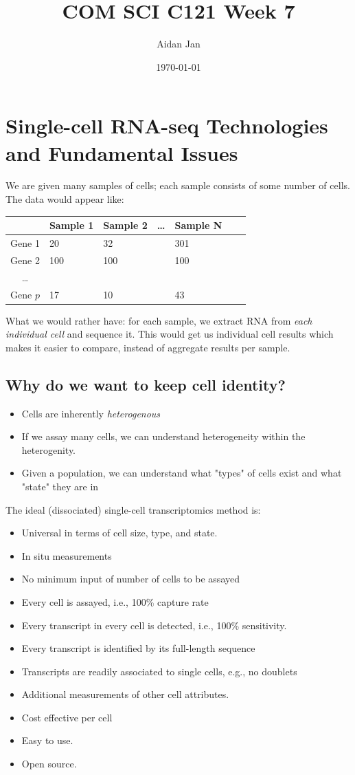 \documentclass[10pt]{article}
\title{COM SCI C121 Week 7}
\author{Aidan Jan}
\date{\today}
\begin{document}
\maketitle

\section*{Single-cell RNA-seq Technologies and Fundamental Issues}
We are given many samples of cells; each sample consists of some number of cells.  The data would appear like:
\begin{tabularx}{\textwidth}{|c| * {6}{Y|}}
\hline
 & Sample 1 & Sample 2 & \dots & Sample N\\
\hline
Gene 1 & 20 & 32 & & 301 \\
\hline
Gene 2 & 100 & 100 & & 100 \\
\hline
\dots & & & & \\
\hline
Gene $p$ & 17 & 10 & & 43\\
\hline
\end{tabularx}
What we would rather have: for each sample, we extract RNA from \textit{each individual cell} and sequence it.  
This would get us individual cell results which makes it easier to compare, instead of aggregate results per sample.

\subsection*{Why do we want to keep cell identity?}
\begin{itemize}
    \item Cells are inherently \textit{heterogenous}
    \item If we assay many cells, we can understand heterogeneity within the heterogenity.
    \item Given a population, we can understand what "types" of cells exist and what "state" they are in
\end{itemize}

The ideal (dissociated) single-cell transcriptomics method is:
\begin{itemize}
    \item Universal in terms of cell size, type, and state.
    \item In situ measurements
    \item No minimum input of number of cells to be assayed
    \item Every cell is assayed, i.e., 100\% capture rate
    \item Every transcript in every cell is detected, i.e., 100\% sensitivity.
    \item Every transcript is identified by its full-length sequence
    \item Transcripts are readily associated to single cells, e.g., no doublets
    \item Additional measurements of other cell attributes.
    \item Cost effective per cell
    \item Easy to use.
    \item Open source.
\end{itemize}
\end{document}
